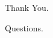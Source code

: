 \documentclass[compress,mathserif]{beamer}
\theoremstyle{definition}
\theoremstyle{plain}
\newcommand{\beI}{\begin{itemize}}
\newcommand{\enI}{\end{itemize}}
\begin{document}
    
\subsection*{}
    \begin{frame}{}
        \begin{center}
          Thank You. 
 
          Questions.
        \end{center}
        
    \end{frame}
\end{document}
